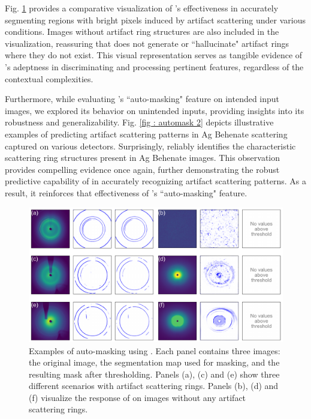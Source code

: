 \documentclass[a4paper]{article}
\begin{document}
Fig. \ref{fig : automask 1} provides a comparative visualization of \peaknet{}'s
effectiveness in accurately segmenting regions with bright pixels induced by
artifact scattering under various conditions.  Images without artifact ring
structures are also included in the visualization, reassuring that \peaknet{}
does not generate or ``hallucinate" artifact rings where they do not exist.  This
visual representation serves as tangible evidence of \peaknet{} 's adeptness in
discriminating and processing pertinent features, regardless of the contextual
complexities.

Furthermore, while evaluating \peaknet{}'s ``auto-masking" feature on intended
input images, we explored its behavior on unintended inputs, providing insights
into its robustness and generalizability.  Fig. \ref{fig : automask 2} depicts
illustrative examples of \peaknet{} predicting artifact scattering patterns in
Ag Behenate scattering captured on various detectors.  Surprisingly, \peaknet{}
reliably identifies the characteristic scattering ring structures present in Ag
Behenate images.  This observation provides compelling evidence once again,
further demonstrating the robust predictive capability of \peaknet{} in
accurately recognizing artifact scattering patterns.  As a result, it reinforces
that effectiveness of \peaknet{}'s ``auto-masking" feature.


\begin{figure}[!ht]
\includegraphics[width=\textwidth,keepaspectratio]
{./figures/automask.pdf} 
\caption{Examples of auto-masking using \peaknet{}.  Each panel contains three
images: the original image, the segmentation map used for masking, and the
resulting mask after thresholding.  Panels (a), (c) and (e) show three different
scenarios with artifact scattering rings.  Panels (b), (d) and (f) visualize the
response of \peaknet{} on images without any artifact scattering rings.}
\label{fig : automask 1} 
\end{figure}
\end{document}
